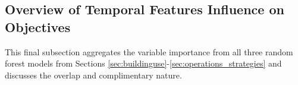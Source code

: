 \subsection{Overview of Temporal Features Influence on Objectives}
\label{sec:overviewuroftemporalfeat}

This final subsection aggregates the variable importance from all three random forest models from Sections \ref{sec:buildinguse}-\ref{sec:operations_strategies} and discusses the overlap and complimentary nature. 




